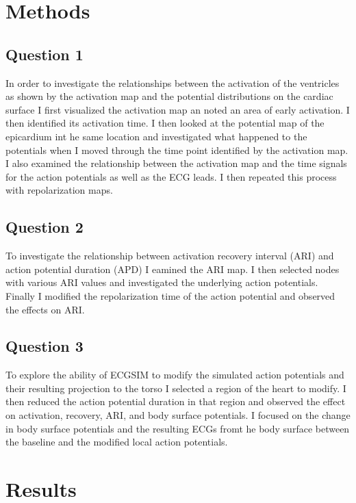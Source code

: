 \documentclass[12pt]{article}
\begin{document}
\section{Methods}
\subsection{Question 1}
In order to investigate the relationships between the activation of the ventricles as shown by the activation map and the potential distributions on the cardiac surface I first visualized the activation map an noted an area of early activation. I then identified its activation time. I then looked at the potential map of the epicardium int he same location and investigated what happened to the potentials when I moved through the time point identified by the activation map. I also examined the relationship between the activation map and the time signals for the action potentials as well as the ECG leads. I then repeated this process with repolarization maps.

\subsection{Question 2}
To investigate the relationship between activation recovery interval (ARI) and action potential duration (APD) I eamined the ARI map. I then selected nodes with various ARI values and investigated the underlying action potentials. Finally I modified the repolarization time of the action potential and observed the effects on ARI.

\subsection{Question 3}
To explore the ability of ECGSIM to modify the simulated action potentials and their resulting projection to the torso I selected a region of the heart to modify. I then reduced the action potential duration in that region and observed the effect on activation, recovery, ARI, and body surface potentials. I focused on the change in body surface potentials and the resulting ECGs fromt he body surface between the baseline and the modified local action potentials.

\section{Results}
\end{document}
